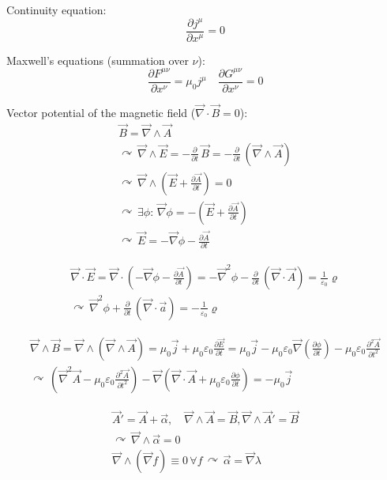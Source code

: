 \documentclass[fontsize=11pt,a4paper]{scrartcl}
\begin{document}
Continuity equation:
\[
	\frac{\partial j^\mu}{\partial x^\mu}=0
\]

Maxwell's equations (summation over $\nu$):
\[
	\frac{\partial F^{\mu\nu}}{\partial x^\nu}=\mu_0 j^\mu\quad\frac{\partial G^{\mu\nu}}{\partial x^\nu}=0
\]

Vector potential of the magnetic field ($\vec\nabla\cdot\vec B=0$):
\begin{gather*}
	\vec B=\vec\nabla\wedge\vec A\\
	\curvearrowright\,\vec\nabla\wedge\vec E=-\frac{\partial}{\partial t}\,\vec B=-\frac{\partial}{\partial t}\,\left(\vec\nabla\wedge\vec A\right)\\
	\curvearrowright\,\vec\nabla\wedge\left(\vec E+\frac{\partial\vec A}{\partial t}\right)=0\\
	\curvearrowright\,\exists\phi:\,\vec\nabla\phi=-\left(\vec E+\frac{\partial\vec A}{\partial t}\right)\\
	\curvearrowright\,\vec E=-\vec\nabla\phi-\frac{\partial\vec A}{\partial t}
\end{gather*}

\begin{gather*}
	\vec\nabla\cdot\vec E=\vec\nabla\cdot\left(-\vec\nabla\phi-\frac{\partial\vec A}{\partial t}\right)=-\vec\nabla^2\phi-\frac{\partial}{\partial t}\,\left(\vec\nabla\cdot\vec A\right)=\frac{1}{\varepsilon_0}\varrho\\
	\curvearrowright\,\vec\nabla^2\phi+\frac{\partial}{\partial t}\,\left(\vec\nabla\cdot\vec a\right)=-\frac{1}{\varepsilon_0}\varrho
\end{gather*}

\begin{gather*}
	\vec\nabla\wedge\vec B=\vec\nabla\wedge\left(\vec\nabla\wedge\vec A\right)=\mu_0\vec j+\mu_0\varepsilon_0\frac{\partial\vec E}{\partial t}=\mu_0\vec j-\mu_0\varepsilon_0\vec\nabla\left(\frac{\partial\phi}{\partial t}\right)-\mu_0\varepsilon_0\frac{\partial^2\vec A}{\partial t^2}\\
	\curvearrowright\,\left(\vec\nabla^2\vec A-\mu_0\varepsilon_0\frac{\partial^2\vec A}{\partial t^2}\right)-\vec\nabla\left(\vec\nabla\cdot\vec A+\mu_0\varepsilon_0\frac{\partial\phi}{\partial t}\right)=-\mu_0\vec j
\end{gather*}

\begin{gather*}
	\vec A'=\vec A+\vec\alpha,\quad\vec\nabla\wedge\vec A=\vec B,\vec\nabla\wedge\vec A'=\vec B\\
	\curvearrowright\,\vec\nabla\wedge\vec\alpha=0\\
	\vec\nabla\wedge(\vec\nabla f)\equiv 0\,\forall f\,\curvearrowright\,\vec\alpha=\vec\nabla\lambda
\end{gather*}
\end{document}
